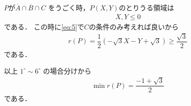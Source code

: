 \documentclass[../../main.tex]{subfiles}
\begin{document}
$P$が$\overline{A} \cap \overline{B} \cap C$ をうごく時，$P(X,Y)$のとりうる領域は
\begin{align}
  X, Y \le 0
\end{align}
である．
この時に\cref{eq:5}で$C$の条件のみ考えれば良いから
\begin{align}
  r(P) = \dfrac{1}{2}(-\sqrt{3}X - Y + \sqrt{3}) \ge \dfrac{\sqrt{3}}{2} \label{eq:13}
\end{align}
である．
\casesend

以上 $1^\circ \sim 6^\circ$ の場合分けから
\begin{align}
  \min r(P) = \dfrac{-1 + \sqrt{3}}{2}
\end{align}
である．
\end{document}
